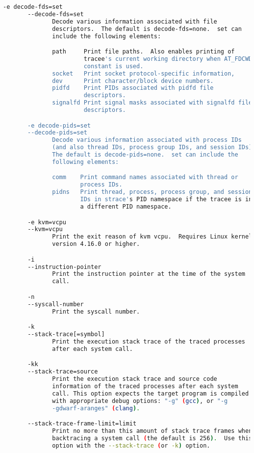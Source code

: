 {{\begin{lstlisting}[language=bash]
       -e decode-fds=set
       --decode-fds=set
              Decode various information associated with file
              descriptors.  The default is decode-fds=none.  set can
              include the following elements:

              path     Print file paths.  Also enables printing of
                       tracee's current working directory when AT_FDCWD
                       constant is used.
              socket   Print socket protocol-specific information,
              dev      Print character/block device numbers.
              pidfd    Print PIDs associated with pidfd file
                       descriptors.
              signalfd Print signal masks associated with signalfd file
                       descriptors.

       -e decode-pids=set
       --decode-pids=set
              Decode various information associated with process IDs
              (and also thread IDs, process group IDs, and session IDs).
              The default is decode-pids=none.  set can include the
              following elements:

              comm    Print command names associated with thread or
                      process IDs.
              pidns   Print thread, process, process group, and session
                      IDs in strace's PID namespace if the tracee is in
                      a different PID namespace.

       -e kvm=vcpu
       --kvm=vcpu
              Print the exit reason of kvm vcpu.  Requires Linux kernel
              version 4.16.0 or higher.

       -i
       --instruction-pointer
              Print the instruction pointer at the time of the system
              call.

       -n
       --syscall-number
              Print the syscall number.

       -k
       --stack-trace[=symbol]
              Print the execution stack trace of the traced processes
              after each system call.

       -kk
       --stack-trace=source
              Print the execution stack trace and source code
              information of the traced processes after each system
              call. This option expects the target program is compiled
              with appropriate debug options: "-g" (gcc), or "-g
              -gdwarf-aranges" (clang).

       --stack-trace-frame-limit=limit
              Print no more than this amount of stack trace frames when
              backtracing a system call (the default is 256).  Use this
              option with the --stack-trace (or -k) option.


\end{lstlisting}}}
